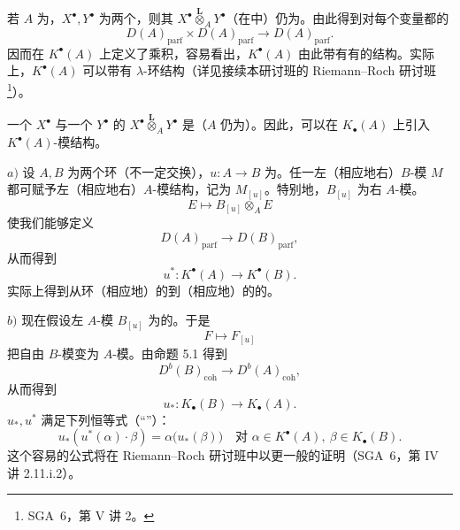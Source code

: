 若 $A$ 为，$X^\bullet,Y^\bullet$ 为两个，则其 $X^\bullet\mathbin{\overset{\mathbf L}{\otimes}}_A Y^\bullet$（在中）仍为。由此得到对每个变量都的
\[
D(A)_{\mathrm{parf}}\times D(A)_{\mathrm{parf}}\longrightarrow D(A)_{\mathrm{parf}}.
\]
因而在 $K^\bullet(A)$ 上定义了乘积，容易看出，$K^\bullet(A)$ 由此带有有的结构。实际上，$K^\bullet(A)$ 可以带有 $\lambda$-环结构（详见接续本研讨班的 Riemann--Roch 研讨班\footnote{SGA~6，第 V 讲 2。}）。

一个 $X^\bullet$ 与一个 $Y^\bullet$ 的 $X^\bullet\mathbin{\overset{\mathbf L}{\otimes}}_A Y^\bullet$ 是（$A$ 仍为）。因此，可以在 $K_\bullet(A)$ 上引入 $K^\bullet(A)$-模结构。

$a)$ 设 $A,B$ 为两个环（不一定交换），$u:A\to B$ 为。任一左（相应地右）$B$-模 $M$ 都可赋予左（相应地右）$A$-模结构，记为 $M_{[u]}$。特别地，$B_{[u]}$ 为右 $A$-模。
\[
E\longmapsto B_{[u]}\otimes_A E
\]
使我们能够定义
\[
D(A)_{\mathrm{parf}}\longrightarrow D(B)_{\mathrm{parf}},
\]
从而得到
\[
u^*:K^\bullet(A)\longrightarrow K^\bullet(B).
\]
实际上得到从环（相应地）的到（相应地）的的。

$b)$ 现在假设左 $A$-模 $B_{[u]}$ 为的。于是
\[
F\longmapsto F_{[u]}
\]
把自由 $B$-模变为 $A$-模。由命题 5.1 得到
\[
D^b(B)_{\mathrm{coh}}\longrightarrow D^b(A)_{\mathrm{coh}},
\]
从而得到
\[
u_*:K_\bullet(B)\longrightarrow K_\bullet(A).
\]
 $u_*,u^*$ 满足下列恒等式（“”）：
\[
u_*(u^*(\alpha)\cdot\beta)=\alpha\bigl(u_*(\beta)\bigr)
\quad\text{对 }\alpha\in K^\bullet(A),\ \beta\in K_\bullet(B).
\]
这个容易的公式将在 Riemann--Roch 研讨班中以更一般的证明（SGA~6，第 IV 讲 2.11.i.2）。


